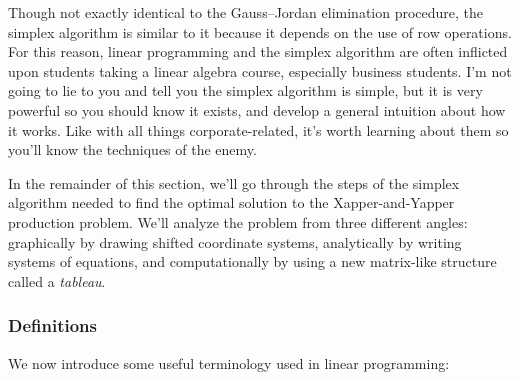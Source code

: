 \documentclass[11pt,oneside]{article}
\begin{document}
	
	\noindent
	Though not exactly identical to the Gauss--Jordan elimination procedure,
	the simplex algorithm is similar to it because it depends on the use of row operations.
	For this reason, linear programming and the simplex algorithm are often inflicted upon 
	students taking a linear algebra course, especially business students.	
	I'm not going to lie to you and tell you the simplex algorithm is simple,
	but it is very powerful so you should know it exists, 
	and develop a general intuition about how it works.
	Like with all things corporate-related,
	it's worth learning about them so you'll know the techniques of the enemy.

	In the remainder of this section, we'll go through the steps of the simplex algorithm 
	needed to find the optimal solution to the Xapper-and-Yapper production problem.
	We'll analyze the problem from three different angles: 
	graphically by drawing shifted coordinate systems,
	analytically by writing systems of equations, 
	and computationally by using a new matrix-like structure called a \emph{tableau}.
	
	
	\subsubsection{Definitions}
		
		We now introduce some useful terminology used in linear programming:
		
\end{document}
